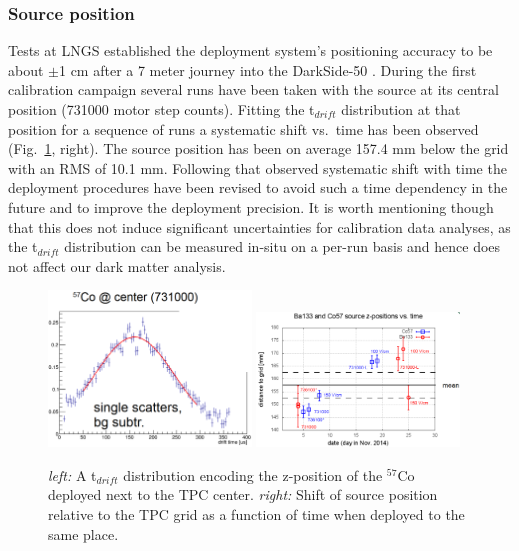 \subsubsection{Source position}
Tests at LNGS established the deployment system's positioning accuracy to be about $\pm$1 cm after a 7 meter journey into the DarkSide-50 \lsv.
During the first calibration campaign several runs have been taken with the source at its central position (731000 motor step counts). Fitting the t$_{drift}$ distribution at that position for a sequence of runs a systematic shift vs.~time has been observed (Fig.~\ref{fig:SourcePosition}, right). The source position has been on average 157.4 mm below the grid with an RMS of 10.1 mm. Following that observed systematic shift with time the deployment procedures have been revised to avoid such a time dependency in the future and to improve the deployment precision. It is worth mentioning though that this does not induce significant uncertainties for calibration data analyses, as the t$_{drift}$ distribution can be measured in-situ on a per-run basis and hence does not affect our dark matter analysis.
\begin{figure}[htbp]
\centering
\includegraphics[width=0.48\textwidth]{./Figures/Tdrift_distribution_Co57_DocDB1288.png}
\includegraphics[width=0.48\textwidth]{./Figures/SourcePosition_vs_time_DocDB1288.png}
\caption{\textit{left:} A t$_{drift}$ distribution encoding the z-position of the $^{57}$Co deployed next to the TPC center.
\textit{right:} Shift of source position relative to the TPC grid as a function of time when deployed to the same place.
\label{fig:SourcePosition}} 
\end{figure}

